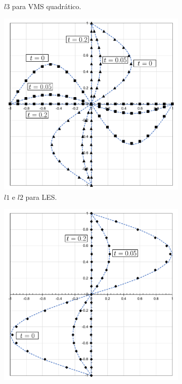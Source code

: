 \begin{figure}[h!]
\begin{subfigure}{0.42\textwidth}
        \caption{$l3$ para VMS quadrático.}
    \end{subfigure}
    \begin{subfigure}{0.42\textwidth}
        \includegraphics[width=\linewidth]{Figuras/taylor-green/LES.pdf}
        \caption{$l1$ e $l2$ para LES.}
    \end{subfigure}
    \begin{subfigure}{0.42\textwidth}
        \includegraphics[width=\linewidth]{Figuras/taylor-green/LES-uz.pdf}

\end{subfigure}
\end{figure}
